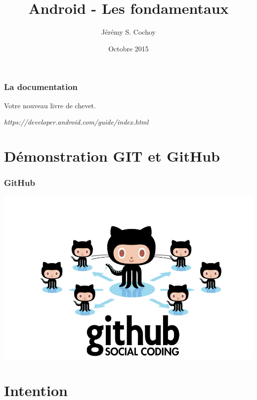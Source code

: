\documentclass{beamer}
\begin{document}
\title{Android - Les fondamentaux}
\author{Jérémy S. Cochoy}
\date{Octobre 2015}


\begin{frame}
\titlepage
\end{frame}

\begin{frame}
\tableofcontents
\end{frame}

\begin{frame}
\frametitle{La documentation}

\begin{block}{Votre nouveau livre de chevet.}
\begin{center}
\emph{https://developer.android.com/guide/index.html}
\end{center}
\end{block}

\end{frame}

\section{Démonstration GIT et GitHub}

\begin{frame}
\frametitle{GitHub}
\begin{center}
\includegraphics[scale=0.4]{github.jpg}
\end{center}
\end{frame}

\section{Intention}
\end{document}
